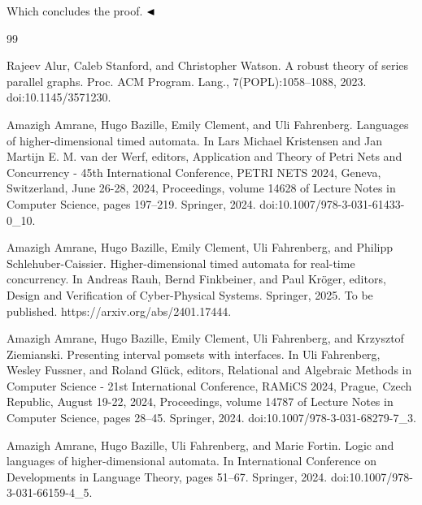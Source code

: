 \documentclass[10pt,a4paper]{article}
\begin{document}
Which concludes the proof. $\hfill\blacktriangleleft$\par
 
 
 
\par
 
 
 

\begin{thebibliography}{99}
\par\noindent    Rajeev Alur, Caleb Stanford, and Christopher Watson.  A robust theory of series parallel graphs.  Proc. ACM Program. Lang., 7(POPL):1058–1088, 2023.  doi:10.1145/3571230.  

\par\noindent    Amazigh Amrane, Hugo Bazille, Emily Clement, and Uli Fahrenberg.  Languages of higher-dimensional timed automata.  In Lars Michael Kristensen and Jan Martijn E. M. van der Werf, editors, Application and Theory of Petri Nets and Concurrency - 45th International Conference, PETRI NETS 2024, Geneva, Switzerland, June 26-28, 2024, Proceedings, volume 14628 of Lecture Notes in Computer Science, pages 197–219. Springer, 2024.  doi:10.1007/978-3-031-61433-0\_10.  

\par\noindent    Amazigh Amrane, Hugo Bazille, Emily Clement, Uli Fahrenberg, and Philipp Schlehuber-Caissier.  Higher-dimensional timed automata for real-time concurrency.  In Andreas Rauh, Bernd Finkbeiner, and Paul Kröger, editors, Design and Verification of Cyber-Physical Systems. Springer, 2025.  To be published. https://arxiv.org/abs/2401.17444.  

\par\noindent    Amazigh Amrane, Hugo Bazille, Emily Clement, Uli Fahrenberg, and Krzysztof Ziemianski.  Presenting interval pomsets with interfaces.  In Uli Fahrenberg, Wesley Fussner, and Roland Glück, editors, Relational and Algebraic Methods in Computer Science - 21st International Conference, RAMiCS 2024, Prague, Czech Republic, August 19-22, 2024, Proceedings, volume 14787 of Lecture Notes in Computer Science, pages 28–45. Springer, 2024.  doi:10.1007/978-3-031-68279-7\_3.  

\par\noindent    Amazigh Amrane, Hugo Bazille, Uli Fahrenberg, and Marie Fortin.  Logic and languages of higher-dimensional automata.  In International Conference on Developments in Language Theory, pages 51–67. Springer, 2024.  doi:10.1007/978-3-031-66159-4\_5.  


\end{thebibliography}
\end{document}
